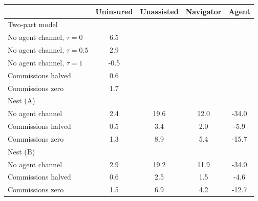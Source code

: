 \begin{tabular}{lcccc}
\hline\hline
 & Uninsured & Unassisted & Navigator & Agent \\
\hline
\multicolumn{5}{l}{Two-part model} \\
\quad No agent channel, $\tau = 0$ & 6.5 & & & \\
\quad No agent channel, $\tau = 0.5$ & 2.9 & & & \\
\quad No agent channel, $\tau = 1$ & -0.5 & & & \\
\quad Commissions halved & 0.6 & & & \\
\quad Commissions zero & 1.7 & & & \\
\multicolumn{5}{l}{Nest (A)} \\
\quad No agent channel & 2.4 & 19.6 & 12.0 & -34.0 \\
\quad Commissions halved & 0.5 & 3.4 & 2.0 & -5.9 \\
\quad Commissions zero & 1.3 & 8.9 & 5.4 & -15.7 \\
\multicolumn{5}{l}{Nest (B)} \\
\quad No agent channel & 2.9 & 19.2 & 11.9 & -34.0 \\
\quad Commissions halved & 0.6 & 2.5 & 1.5 & -4.6 \\
\quad Commissions zero & 1.5 & 6.9 & 4.2 & -12.7 \\
\hline\hline
\end{tabular}
